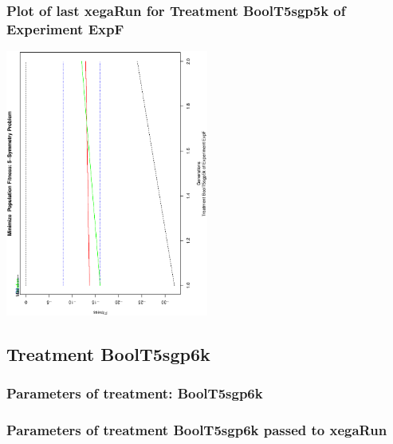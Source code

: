 \documentclass[18pt,c]{beamer}
\begin{document}
 \begin{frame}
 \frametitle{ Plot of last xegaRun for Treatment BoolT5sgp5k of Experiment ExpF }
 \begin{center}
\includegraphics[width=0.5\textwidth, angle=-90]
{ExpFPlotPopStatsFigure006.eps}
 \end{center}
 \label{report/ExpFPlotPopStatsFigure006.eps}  
 \end{frame}

\clearpage
\subsection{Treatment BoolT5sgp6k}

 \begin{frame}
 \fontsize{8pt}{9pt}\selectfont
 \frametitle{  Parameters of treatment: BoolT5sgp6k 
 }

 \label{ExpFtParmTable028.tex}  
 \end{frame}


 \begin{frame}
 \fontsize{8pt}{9pt}\selectfont
 \frametitle{  Parameters of treatment BoolT5sgp6k passed to xegaRun
 }

 \label{ExpFtParmTable029.tex}  
 \end{frame}
\end{document}
